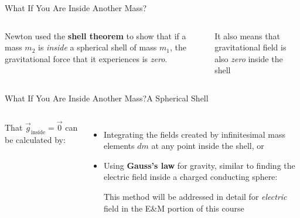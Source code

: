 \documentclass[12pt,compress,aspectratio=169]{beamer}
\begin{document}
\begin{frame}{What If You Are Inside Another Mass?}
  \begin{columns}

    Newton used the \textbf{shell theorem} to show that if a mass $m_2$ is
    \emph{inside} a spherical shell of mass $m_1$, the gravitational force that
    it experiences is \emph{zero}.
      
      
    It also means that gravitational field is also \emph{zero} inside the shell
  \end{columns}
\end{frame}



\begin{frame}{What If You Are Inside Another Mass?}{A Spherical Shell}
  \begin{columns}

    That $\vec g_\text{inside}=\vec 0$ can be calculated by:
    \begin{itemize}
    \item Integrating the fields created by infinitesimal mass elements $dm$ at
      any point inside the shell, or
    \item Using \textbf{Gauss's law} for gravity, similar to finding the
      electric field inside a charged conducting sphere:
      

      \vspace{-.07in}This method will be addressed in detail for
      \emph{electric} field in the E\&M portion of this course
    \end{itemize}
  \end{columns}
\end{frame}
\end{document}
